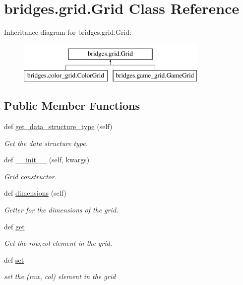 \hypertarget{classbridges_1_1grid_1_1_grid}{}\section{bridges.\+grid.\+Grid Class Reference}
\label{classbridges_1_1grid_1_1_grid}
Inheritance diagram for bridges.\+grid.\+Grid\+:\begin{figure}[H]
\begin{center}
\leavevmode
\includegraphics[height=2.000000cm]{classbridges_1_1grid_1_1_grid}
\end{center}
\end{figure}
\subsection*{Public Member Functions}
\begin{DoxyCompactItemize}
\item 
def \mbox{\hyperlink{classbridges_1_1grid_1_1_grid_ab1a040a486bbad5259fec54fb885eac1}{get\+\_\+data\+\_\+structure\+\_\+type}} (self)
\begin{DoxyCompactList}\small\item\em Get the data structure type. \end{DoxyCompactList}\item 
def \mbox{\hyperlink{classbridges_1_1grid_1_1_grid_a25587e3c0f450b336fc7bb11fc718c36}{\+\_\+\+\_\+init\+\_\+\+\_\+}} (self, kwargs)
\begin{DoxyCompactList}\small\item\em \mbox{\hyperlink{classbridges_1_1grid_1_1_grid}{Grid}} constructor. \end{DoxyCompactList}\item 
def \mbox{\hyperlink{classbridges_1_1grid_1_1_grid_a48f2107f2a2e970ada851012019a01dc}{dimensions}} (self)
\begin{DoxyCompactList}\small\item\em Getter for the dimensions of the grid. \end{DoxyCompactList}\item 
def \mbox{\hyperlink{classbridges_1_1grid_1_1_grid_a354c049fedceef226ff62aedf78c2a72}{get}}
\begin{DoxyCompactList}\small\item\em Get the row,col element in the grid. \end{DoxyCompactList}\item 
def \mbox{\hyperlink{classbridges_1_1grid_1_1_grid_a40d076434ad49fe29f6a931aba9f442b}{set}}
\begin{DoxyCompactList}\small\item\em set the (row, col) element in the grid \end{DoxyCompactList}\end{DoxyCompactItemize}
